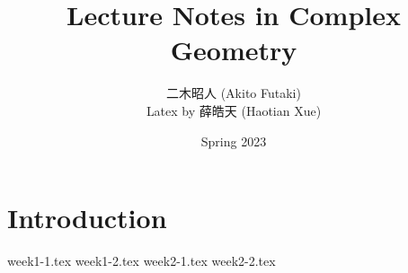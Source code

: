 \documentclass[twoside,12pt]{book}
\title{\Huge Lecture Notes in Complex Geometry}
\author{{\Large 二木昭人} (Akito Futaki)\\
Latex by 薛皓天 (Haotian Xue)}
\date{\Large Spring 2023}
\begin{document}
\maketitle
\frontmatter
\tableofcontents
\newpage
\mainmatter{}
\chapter{Introduction}
{week1-1.tex}
{week1-2.tex}
{week2-1.tex}
{week2-2.tex}
\end{document}
